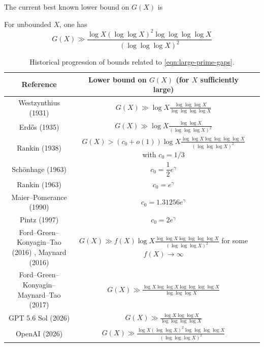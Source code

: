 The current best known lower bound on $G(X)$ is
\begin{theorem}
For unbounded $X$, one has
\[
G(X) \gg \frac{\log X (\log \log X)^2 \log\log\log \log X}{(\log \log \log X)^2}
\]
\end{theorem}
\begin{table}[ht]
    \caption{Historical progression of bounds related to \eqref{eqn:large-prime-gaps}.}
    \label{small-primegap-table2}
    \centering
    \renewcommand{\arraystretch}{2.2}
    \begin{tabular}{|c|c|c|}
    \hline
    Reference & Lower bound on $G(X)$ (for $X$ sufficiently large) \\
    \hline
    Westzynthius (1931) \cite{westzynthius_uber_1931} & $\displaystyle G(X) \gg \log X \frac{\log\log\log X}{\log\log\log\log X}$\\
    \hline
    Erdős (1935) \cite{erdos_difference_1935} & $\displaystyle G(X) \gg \log X \frac{\log\log X}{(\log\log\log X)^2}$ \\
    \hline
    Rankin (1938) \cite{rankin_difference_1938} & $\displaystyle G(X) > (c_0 + o(1))\log X \frac{\log \log X \log \log \log \log X}{(\log \log \log X)^2}$ with $c_0 = 1/3$ \\
    \hline
    Sch\"{o}nhage (1963) \cite{schonhage_bemerkung_1963} & $c_0 = \dfrac{1}{2}e^\gamma$\\
    \hline
    Rankin (1963) \cite{rankin_difference_1963} & $c_0 = e^\gamma$ \\
    \hline
    Maier--Pomerance (1990) \cite{maier_unusually_1990} & $c_0 = 1.31256 e^\gamma$\\
    \hline
    Pintz (1997) \cite{pintz_very_1997} & $c_0 = 2e^\gamma$\\
    \hline
    Ford--Green--Konyagin--Tao (2016) \cite{ford_large_2016}, Maynard (2016) \cite{maynard_large_2016} & $\displaystyle G(X) \gg f(X)\log X \frac{\log \log X \log \log \log \log X}{(\log \log \log X)^2}$ for some $f(X) \to \infty$\\
    \hline
    Ford--Green--Konyagin--Maynard--Tao (2017) \cite{ford_long_2017} & $\displaystyle G(X) \gg \frac{\log X \log \log X \log\log\log \log X}{\log \log \log X}$ \\
    \hline
    GPT 5.6 Sol (2026) \cite{GPT56Sol_LargeGap} & $\displaystyle G(X) \gg \frac{\log X \log \log X}{\log \log \log \log X}$ \\
    \hline
    OpenAI (2026) \cite{OpenAI_LargeGap} & $\displaystyle G(X) \gg \frac{\log X (\log \log X)^2 \log\log\log \log X}{(\log \log \log X)^2}$ \\
    \hline
    \end{tabular}
    \end{table}
